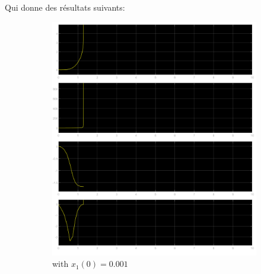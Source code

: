 \documentclass[class=article, crop=false]{standalone}
\begin{document}
\begin{resolution}
    Qui donne des résultats suivants:
    \begin{figure}[H]
        \centering
        \begin{subfigure}[b]{0.475\textwidth}
            \centering
            \includegraphics[width=\textwidth]{../images/simulink_scope2_0_001.png}
            \caption{with $x_1(0) = 0.001$}
        \end{subfigure}
        \begin{subfigure}[b]{0.475\textwidth}
            \centering

\end{subfigure}
\end{figure}
\end{resolution}
\end{document}
